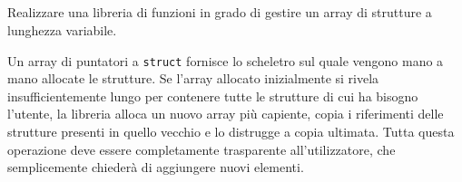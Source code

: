 \documentclass{article}
\begin{document}
%
%
%
%


\subsection{}
Realizzare una libreria di funzioni in grado di gestire un array di strutture a lunghezza variabile.

Un array di puntatori a \texttt{struct} fornisce lo scheletro sul quale vengono mano a mano allocate le strutture. Se l'array allocato inizialmente si rivela insufficientemente lungo per contenere tutte le strutture di cui ha bisogno l'utente, la libreria alloca un nuovo array più capiente, copia i riferimenti delle strutture presenti in quello vecchio e lo distrugge a copia ultimata. Tutta questa operazione deve essere completamente trasparente all'utilizzatore, che semplicemente chiederà di aggiungere nuovi elementi. 
\end{document}

